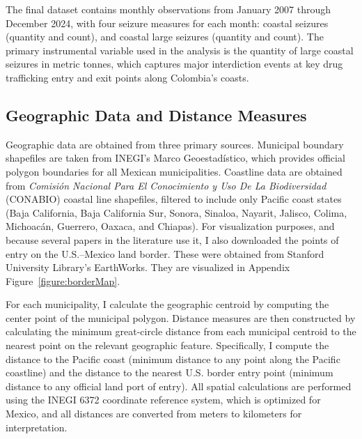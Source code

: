 \documentclass[12pt,letter,english,intoc,bibliography=totoc,index=totoc,BCOR10mm,captions=tableheading,nottitlepage,fleqn]{article}
\theoremstyle{break}
\begin{document}
The final dataset contains monthly observations from January 2007 through December 2024, with four seizure measures for each month: coastal seizures (quantity and count), and coastal large seizures (quantity and count). The primary instrumental variable used in the analysis is the quantity of large coastal seizures in metric tonnes, which captures major interdiction events at key drug trafficking entry and exit points along Colombia's coasts.

\subsection{Geographic Data and Distance Measures}
Geographic data are obtained from three primary sources. Municipal boundary shapefiles are taken from INEGI's Marco Geoestad\'{i}stico, which provides official polygon boundaries for all Mexican municipalities. Coastline data are obtained from \emph{Comisi\'{o}n Nacional Para El Conocimiento y Uso De La Biodiversidad} (CONABIO) coastal line shapefiles, filtered to include only Pacific coast states (Baja California, Baja California Sur, Sonora, Sinaloa, Nayarit, Jalisco, Colima, Michoac\'{a}n, Guerrero, Oaxaca, and Chiapas). For visualization purposes, and because several papers in the literature use it, I also downloaded the points of entry on the U.S.--Mexico land border. These were obtained from  Stanford University Library's EarthWorks. They are visualized in Appendix Figure~\ref{figure:borderMap}. 

For each municipality, I calculate the geographic centroid by computing the center point of the municipal polygon. Distance measures are then constructed by calculating the minimum great-circle distance from each municipal centroid to the nearest point on the relevant geographic feature. Specifically, I compute the distance to the Pacific coast (minimum distance to any point along the Pacific coastline) and the distance to the nearest U.S. border entry point (minimum distance to any official land port of entry). All spatial calculations are performed using the INEGI 6372 coordinate reference system, which is optimized for Mexico, and all distances are converted from meters to kilometers for interpretation.
\end{document}
